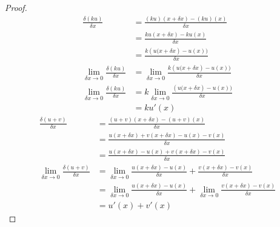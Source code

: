 \documentclass[main.tex]{subfiles}
\begin{document}
\begin{proof}
	\setlength{\abovedisplayskip}{3pt}
	\setlength{\belowdisplayskip}{3pt}
\begin{align*}
	\frac{\delta (ku)}{\delta x}&= \frac{(ku)(x+\delta x)-(ku)(x)}{\delta x}\\
	& =  \frac{ku(x+\delta x)-ku(x)}{\delta x}  \\
	& =  \frac{k(u\big(x+\delta x)-u(x)\big)}{\delta x}  \\
\lim_{\delta x\to 0}	\frac{\delta (ku)}{\delta x}&= 	\lim_{\delta x\to 0} \frac{k(u\big(x+\delta x)-u(x)\big)}{\delta x}  \\
\lim_{\delta x\to 0}	\frac{\delta (ku)}{\delta x}&= 	k\lim_{\delta x\to 0} \frac{(u\big(x+\delta x)-u(x)\big)}{\delta x}  \\
&=k u'(x) 
\end{align*} 
\setlength{\abovedisplayskip}{3pt}
\setlength{\belowdisplayskip}{3pt}
\begin{align*}
	\frac{\delta (u+v)}{\delta x}&= \frac{(u+v)(x+\delta x)-(u+v)(x)}{\delta x}\\
	& =  \frac{u(x+\delta x)+v(x+\delta x)-u(x)-v(x)}{\delta x}  \\
	& =  \frac{u(x+\delta x)-u(x)+v(x+\delta x)-v(x)}{\delta x}  \\
\lim_{\delta x\to 0} \frac{\delta (u+v)}{\delta x}
	& = \lim_{\delta x\to 0} \frac{u(x+\delta x)-u(x)}{\delta x} +  \frac{v(x+\delta x)-v(x)}{\delta x}  \\
& = \lim_{\delta x\to 0} \frac{u(x+\delta x)-u(x)}{\delta x} +\lim_{\delta x\to 0} \frac{v(x+\delta x)-v(x)}{\delta x}  \\
	& = u'(x) +v'(x)
\end{align*}  
\end{proof}
\end{document}

